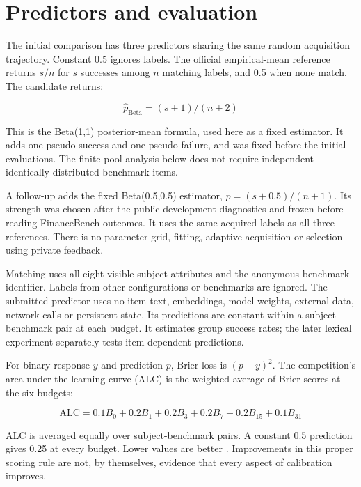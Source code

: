 \documentclass{article}
\begin{document}
\section{Predictors and evaluation}\label{predictors-and-evaluation}

The initial comparison has three predictors sharing the same random acquisition trajectory. Constant 0.5 ignores labels. The official empirical-mean reference \cite{ref2} returns \(s/n\) for \(s\) successes among \(n\) matching labels, and 0.5 when none match. The candidate returns:

\begin{equation}
\widehat p_{\mathrm{Beta}}=(s+1)/(n+2)
\end{equation}

This is the Beta(1,1) posterior-mean formula, used here as a fixed estimator. It adds one pseudo-success and one pseudo-failure, and was fixed before the initial evaluations. The finite-pool analysis below does not require independent identically distributed benchmark items.

A follow-up adds the fixed Beta(0.5,0.5) estimator, \(p=(s+0.5)/(n+1)\). Its strength was chosen after the public development diagnostics and frozen before reading FinanceBench outcomes. It uses the same acquired labels as all three references. There is no parameter grid, fitting, adaptive acquisition or selection using private feedback.

Matching uses all eight visible subject attributes and the anonymous benchmark identifier. Labels from other configurations or benchmarks are ignored. The submitted predictor uses no item text, embeddings, model weights, external data, network calls or persistent state. Its predictions are constant within a subject-benchmark pair at each budget. It estimates group success rates; the later lexical experiment separately tests item-dependent predictions.

For binary response \(y\) and prediction \(p\), Brier loss is \((p-y)^2\). The competition's area under the learning curve (ALC) is the weighted average of Brier scores at the six budgets:

\begin{equation}
\mathrm{ALC}=0.1 B_0+0.2 B_1+0.2 B_3+0.2 B_7+0.2 B_{15}+0.1 B_{31}
\end{equation}

ALC is averaged equally over subject-benchmark pairs. A constant 0.5 prediction gives 0.25 at every budget. Lower values are better \cite{ref1}. Improvements in this proper scoring rule are not, by themselves, evidence that every aspect of calibration improves.
\end{document}
